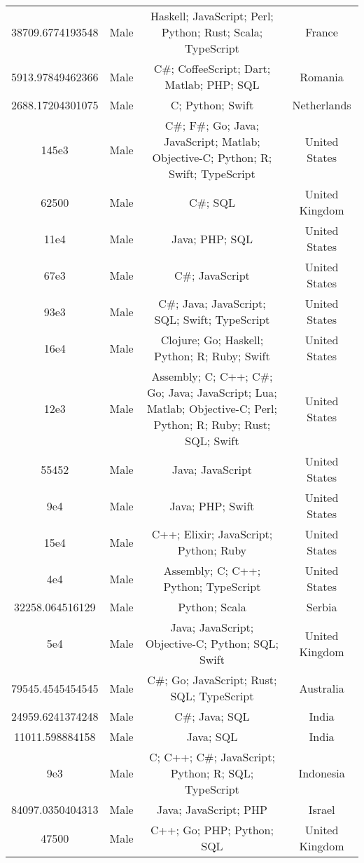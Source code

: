 \begin{center}
\begin{tabular}{ |c|c|c|c| }
38709.6774193548  &  Male  &  Haskell; JavaScript; Perl; Python; Rust; Scala; TypeScript  &  France  \\ 
5913.97849462366  &  Male  &  C\#; CoffeeScript; Dart; Matlab; PHP; SQL  &  Romania  \\ 
2688.17204301075  &  Male  &  C; Python; Swift  &  Netherlands  \\ 
145e3  &  Male  &  C\#; F\#; Go; Java; JavaScript; Matlab; Objective-C; Python; R; Swift; TypeScript  &  United States  \\ 
62500  &  Male  &  C\#; SQL  &  United Kingdom  \\ 
11e4  &  Male  &  Java; PHP; SQL  &  United States  \\ 
67e3  &  Male  &  C\#; JavaScript  &  United States  \\ 
93e3  &  Male  &  C\#; Java; JavaScript; SQL; Swift; TypeScript  &  United States  \\ 
16e4  &  Male  &  Clojure; Go; Haskell; Python; R; Ruby; Swift  &  United States  \\ 
12e3  &  Male  &  Assembly; C; C++; C\#; Go; Java; JavaScript; Lua; Matlab; Objective-C; Perl; Python; R; Ruby; Rust; SQL; Swift  &  United States  \\ 
55452  &  Male  &  Java; JavaScript  &  United States  \\ 
9e4  &  Male  &  Java; PHP; Swift  &  United States  \\ 
15e4  &  Male  &  C++; Elixir; JavaScript; Python; Ruby  &  United States  \\ 
4e4  &  Male  &  Assembly; C; C++; Python; TypeScript  &  United States  \\ 
32258.064516129  &  Male  &  Python; Scala  &  Serbia  \\ 
5e4  &  Male  &  Java; JavaScript; Objective-C; Python; SQL; Swift  &  United Kingdom  \\ 
79545.4545454545  &  Male  &  C\#; Go; JavaScript; Rust; SQL; TypeScript  &  Australia  \\ 
24959.6241374248  &  Male  &  C\#; Java; SQL  &  India  \\ 
11011.598884158  &  Male  &  Java; SQL  &  India  \\ 
9e3  &  Male  &  C; C++; C\#; JavaScript; Python; R; SQL; TypeScript  &  Indonesia  \\ 
84097.0350404313  &  Male  &  Java; JavaScript; PHP  &  Israel  \\ 
47500  &  Male  &  C++; Go; PHP; Python; SQL  &  United Kingdom  \\ 

\end{tabular}
\end{center}
